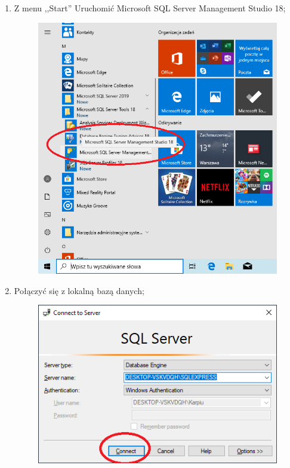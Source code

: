 \documentclass[12pt,a4paper]{article}
\begin{document}
\begin{enumerate}
				\item Z menu ,,Start'' Uruchomić Microsoft SQL Server Management Studio 18;
					\begin{figure}[H]
						\centering
						\includegraphics[scale=0.4]{img/Local_Install_8.png}
					\end{figure}
							
				\item Połączyć się z lokalną bazą danych;
					\begin{figure}[H]
						\centering
						\includegraphics[scale=0.4]{img/Local_Install_9.png}
					\end{figure}
						

\end{enumerate}
\end{document}
